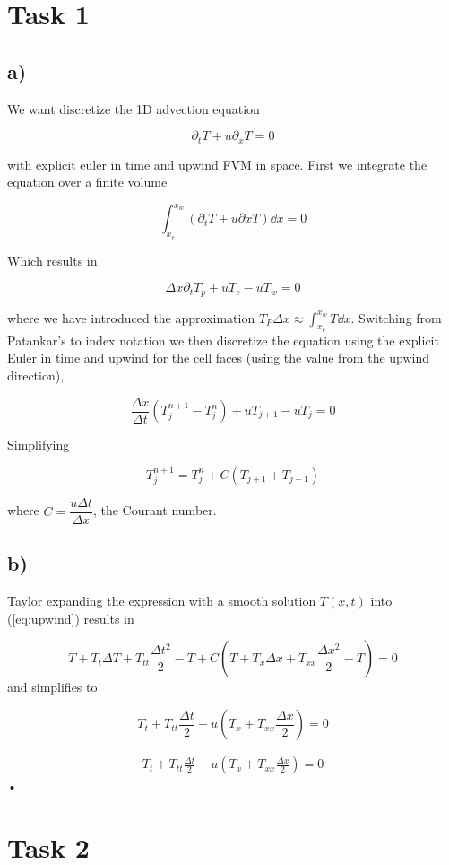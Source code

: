 \documentclass{article}
\begin{document}
\section{Task 1}

\subsection{a)}
We want discretize the 1D advection equation 

\begin{equation}
 	\partial_t T + u \partial_x T = 0	
\end{equation}

with explicit euler in time and upwind FVM in space. First we integrate the equation over a finite volume

\begin{equation}
 	\int_{x_e}^{x_w} (\partial_t T + u \partial x T )\dd{x} = 0
\end{equation}

Which results in 

\begin{equation}
\Delta x \partial_t T_p + uT_e - uT_w = 0
\end{equation}

where we have introduced the approximation $T_P \Delta x  \approx \int_{x_e}^{x_w} T\dd{x}$. Switching from Patankar's to index notation we then discretize the equation using the explicit Euler in time and upwind for the cell faces (using the value from the upwind direction),

\begin{equation}
	\frac{\Delta x}{\Delta t} (T_j^{n+1} - T_j^n) + u T_{j+1} - uT_j = 0
\end{equation}

Simplifying

\begin{equation}
	\label{eq:upwind}
 	T_j^{n+1} = T_j^n + C (T_{j+1} + T_{j-1})
\end{equation}

where $C = \dfrac{u\Delta t}{\Delta x}$, the Courant number.

\subsection*{b)}

Taylor expanding the expression with a smooth solution $T(x,t)$ into (\ref{eq:upwind}) results in

\begin{equation}
 	T + T_t \Delta T + T_{tt}\frac{\Delta t^2}{2} - T +	C(T + T_x \Delta x + T_{xx}  \frac{\Delta x^2}{2} - T) = 0
\end{equation}
and simplifies to

\begin{equation}
 	T_t  + T_{tt}\frac{\Delta t}{2} +	u( T_x  + T_{xx}  \frac{\Delta x}{2} ) =0
\end{equation}

\begin{align}
	T_t  + T_{tt}\frac{\Delta t}{2} +	u( T_x  + T_{xx}  \frac{\Delta x}{2} ) =0
\end{align}•

\section{Task 2}
\end{document}
